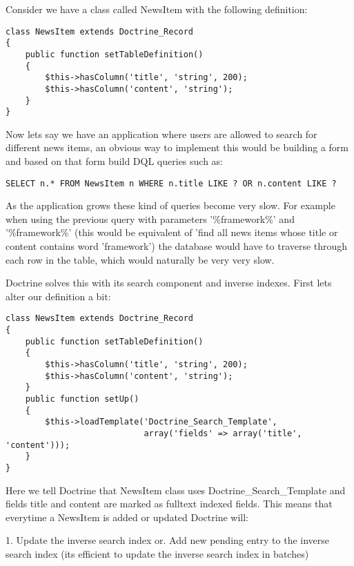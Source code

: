 \documentclass[11pt,a4paper]{report}
\begin{document}
Consider we have a class called NewsItem with the following definition:

\begin{verbatim}
class NewsItem extends Doctrine_Record
{
    public function setTableDefinition()
    {
        $this->hasColumn('title', 'string', 200);
        $this->hasColumn('content', 'string');
    }
}
\end{verbatim}

Now lets say we have an application where users are allowed to search for different news items, an obvious way to implement this would be building a form and based on that form build DQL queries such as:

\begin{verbatim}
SELECT n.* FROM NewsItem n WHERE n.title LIKE ? OR n.content LIKE ?
\end{verbatim}

As the application grows these kind of queries become very slow. For example\newline
when using the previous query with parameters '\%framework\%' and '\%framework\%'\newline
(this would be equivalent of 'find all news items whose title or content\newline
contains word 'framework') the database would have to traverse through each row in the table, which would naturally be very very slow.

Doctrine solves this with its search component and inverse indexes. First lets alter our definition a bit:

\begin{verbatim}
class NewsItem extends Doctrine_Record
{
    public function setTableDefinition()
    {
        $this->hasColumn('title', 'string', 200);
        $this->hasColumn('content', 'string');
    }
    public function setUp()
    {
        $this->loadTemplate('Doctrine_Search_Template',
                            array('fields' => array('title', 'content')));
    }
}
\end{verbatim}

Here we tell Doctrine that NewsItem class uses Doctrine\_Search\_Template and fields title and content are marked as fulltext indexed fields. This means that everytime a NewsItem is added or updated Doctrine will:

1. Update the inverse search index or. Add new pending entry to the inverse search index (its efficient to update the inverse search index in batches)
\end{document}
